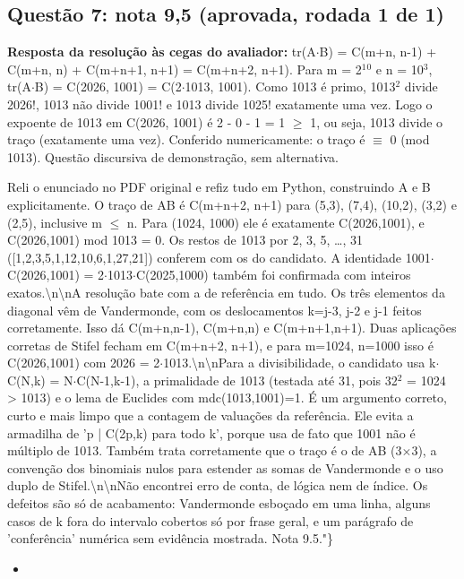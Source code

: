 \documentclass{article}%
\begin{document}
\subsection*{Questão 7: nota 9,5 (aprovada, rodada 1 de 1)}%
\textbf{Resposta da resolução às cegas do avaliador:} tr(A$\cdot$B) = C(m+n, n-1) + C(m+n, n) + C(m+n+1, n+1) = C(m+n+2, n+1). Para m = 2$^{1}$$^{0}$ e n = 10$^3$, tr(A$\cdot$B) = C(2026, 1001) = C(2$\cdot$1013, 1001). Como 1013 é primo, 1013$^2$ divide 2026!, 1013 não divide 1001! e 1013 divide 1025! exatamente uma vez. Logo o expoente de 1013 em C(2026, 1001) é 2 - 0 - 1 = 1 $\geq$ 1, ou seja, 1013 divide o traço (exatamente uma vez). Conferido numericamente: o traço é $\equiv$ 0 (mod 1013). Questão discursiva de demonstração, sem alternativa.\par %
Reli o enunciado no PDF original e refiz tudo em Python, construindo A e B explicitamente. O traço de AB é C(m+n+2, n+1) para (5,3), (7,4), (10,2), (3,2) e (2,5), inclusive m $\leq$ n. Para (1024, 1000) ele é exatamente C(2026,1001), e C(2026,1001) mod 1013 = 0. Os restos de 1013 por 2, 3, 5, \ldots{}, 31 ({[}1,2,3,5,1,12,10,6,1,27,21{]}) conferem com os do candidato. A identidade 1001$\cdot$C(2026,1001) = 2$\cdot$1013$\cdot$C(2025,1000) também foi confirmada com inteiros exatos.\textbackslash{}n\textbackslash{}nA resolução bate com a de referência em tudo. Os três elementos da diagonal vêm de Vandermonde, com os deslocamentos k=j-3, j-2 e j-1 feitos corretamente. Isso dá C(m+n,n-1), C(m+n,n) e C(m+n+1,n+1). Duas aplicações corretas de Stifel fecham em C(m+n+2, n+1), e para m=1024, n=1000 isso é C(2026,1001) com 2026 = 2$\cdot$1013.\textbackslash{}n\textbackslash{}nPara a divisibilidade, o candidato usa k$\cdot$C(N,k) = N$\cdot$C(N-1,k-1), a primalidade de 1013 (testada até 31, pois 32$^2$ = 1024 > 1013) e o lema de Euclides com mdc(1013,1001)=1. É um argumento correto, curto e mais limpo que a contagem de valuações da referência. Ele evita a armadilha de 'p | C(2p,k) para todo k', porque usa de fato que 1001 não é múltiplo de 1013. Também trata corretamente que o traço é o de AB (3$\times$3), a convenção dos binomiais nulos para estender as somas de Vandermonde e o uso duplo de Stifel.\textbackslash{}n\textbackslash{}nNão encontrei erro de conta, de lógica nem de índice. Os defeitos são só de acabamento: Vandermonde esboçado em uma linha, alguns casos de k fora do intervalo cobertos só por frase geral, e um parágrafo de 'conferência' numérica sem evidência mostrada. Nota 9.5."\}%
\begin{itemize}%
\item%

\end{itemize}$$
\end{document}
